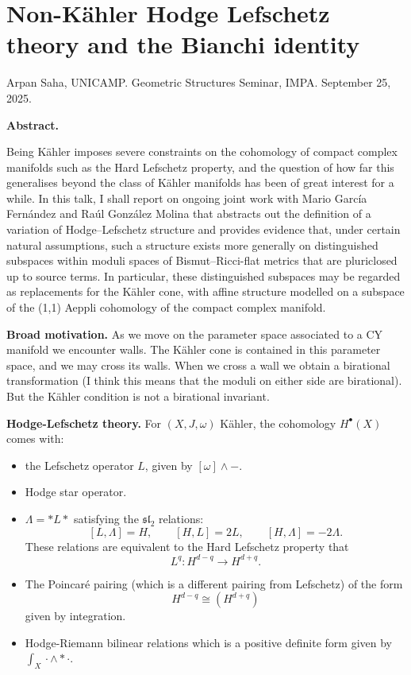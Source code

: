 \section{Non-Kähler Hodge Lefschetz theory
and the Bianchi identity}
\label{section-non-kahle-hodge-lefsc-theor}

\noindent
Arpan Saha, UNICAMP.
Geometric Structures Seminar, IMPA.
September 25, 2025.

\medskip\noindent
{\bf Abstract.}

Being Kähler imposes severe constraints on
the cohomology of compact complex
manifolds such as the Hard Lefschetz
property, and the question of how far this
generalises beyond the class of Kähler
manifolds has been of great interest for
a while. In this talk, I shall report on
ongoing joint work with Mario García
Fernández and Raúl González Molina that
abstracts out the definition of a
variation of Hodge--Lefschetz structure and
provides evidence that, under
certain natural assumptions, such a structure
exists more generally on
distinguished subspaces within moduli spaces
of Bismut--Ricci-flat metrics that
are pluriclosed up to source terms. In
particular, these distinguished subspaces
may be regarded as replacements for the
Kähler cone, with affine structure
modelled on a subspace of the (1,1) Aeppli
cohomology of the compact complex
manifold.

\medskip\noindent
{\bf Broad motivation.}
As we move on the parameter space associated
to a CY manifold we encounter walls.
The Kähler cone is contained in this
parameter space, and we may cross
its walls. When we cross a wall
we obtain a birational transformation
(I think this means that the moduli
on either side are birational).
But the Kähler condition is not a
birational invariant.

\medskip\noindent
{\bf Hodge-Lefschetz theory.}
For $(X,J,\omega)$ Kähler,
the cohomology $H^{\bullet}(X)$ comes with:
\begin{itemize}
\item the Lefschetz operator $L$,
given by $[\omega]\wedge-$.

\item Hodge star operator.
\item $\Lambda=* L *$ satisfying
the $\mathfrak{sl}_2$ relations:
$$
[L,\Lambda]=H,\qquad [H,L]=2L,\qquad
[H,\Lambda]=-2\Lambda.
$$
These relations are equivalent to
the Hard Lefschetz property that
$$
L^q:H^{d-q} \to H^{d+q}.
$$
\item The Poincaré pairing
(which is a different pairing from Lefschetz)
of the form
$$
H^{d-q}\cong (H^{d+q})
$$
given by integration.

\item Hodge-Riemann bilinear relations
which is a positive definite form given by
$\int_X\cdot \wedge *\cdot$.

\end{itemize}


